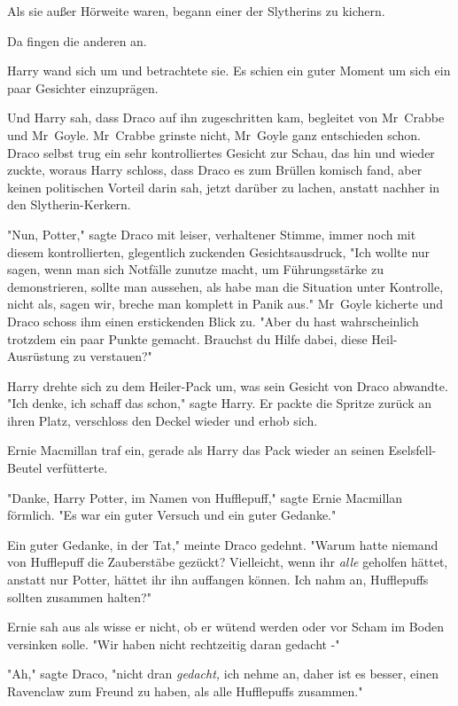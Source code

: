 {Als sie außer Hörweite waren, begann einer der Slytherins zu kichern.

Da fingen die anderen an.

Harry wand sich um und betrachtete sie. Es schien ein guter Moment um sich ein paar Gesichter einzuprägen.

Und Harry sah, dass Draco auf ihn zugeschritten kam, begleitet von Mr~Crabbe und Mr~Goyle. Mr~Crabbe grinste nicht, Mr~Goyle ganz entschieden schon. Draco selbst trug ein sehr kontrolliertes Gesicht zur Schau, das hin und wieder zuckte, woraus Harry schloss, dass Draco es zum Brüllen komisch fand, aber keinen politischen Vorteil darin sah, jetzt darüber zu lachen, anstatt nachher in den Slytherin-Kerkern.

"Nun, Potter," sagte Draco mit leiser, verhaltener Stimme, immer noch mit diesem kontrollierten, glegentlich zuckenden Gesichtsausdruck, "Ich wollte nur sagen, wenn man sich Notfälle zunutze macht, um Führungsstärke zu demonstrieren, sollte man aussehen, als habe man die Situation unter Kontrolle, nicht als, sagen wir, breche man komplett in Panik aus." Mr~Goyle kicherte und Draco schoss ihm einen erstickenden Blick zu. "Aber du hast wahrscheinlich trotzdem ein paar Punkte gemacht. Brauchst du Hilfe dabei, diese Heil-Ausrüstung zu verstauen?"

Harry drehte sich zu dem Heiler-Pack um, was sein Gesicht von Draco abwandte. "Ich denke, ich schaff das schon," sagte Harry. Er packte die Spritze zurück an ihren Platz, verschloss den Deckel wieder und erhob sich.

Ernie Macmillan traf ein, gerade als Harry das Pack wieder an seinen Eselsfell-Beutel verfütterte.

"Danke, Harry Potter, im Namen von Hufflepuff," sagte Ernie Macmillan förmlich. "Es war ein guter Versuch und ein guter Gedanke."

Ein guter Gedanke, in der Tat," meinte Draco gedehnt. "Warum hatte niemand von Hufflepuff die Zauberstäbe gezückt? Vielleicht, wenn ihr \emph{alle} geholfen hättet, anstatt nur Potter, hättet ihr ihn auffangen können. Ich nahm an, Hufflepuffs sollten zusammen halten?"

Ernie sah aus als wisse er nicht, ob er wütend werden oder vor Scham im Boden versinken solle. "Wir haben nicht rechtzeitig daran gedacht -"

"Ah," sagte Draco, "nicht dran \emph{gedacht,} ich nehme an, daher ist es besser, einen Ravenclaw zum Freund zu haben, als alle Hufflepuffs zusammen."

}
